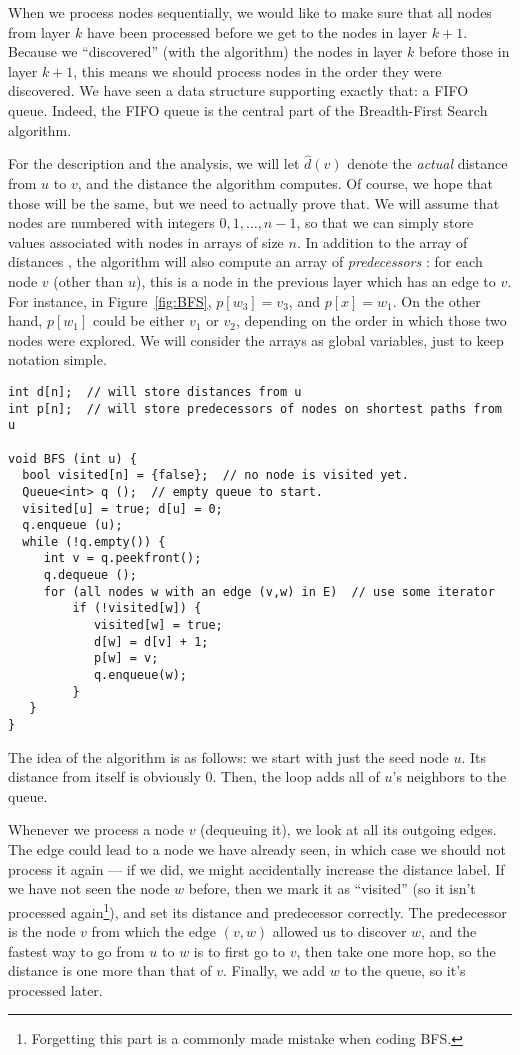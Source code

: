 When we process nodes sequentially, we would like to make sure that
all nodes from layer $k$ have been processed before we get to the
nodes in layer $k+1$. Because we ``discovered'' (with the algorithm)
the nodes in layer $k$ before those in layer $k+1$, this means we
should process nodes in the order they were discovered. 
We have seen a data structure supporting exactly that: a FIFO queue.
Indeed, the FIFO queue is the central part of the Breadth-First Search
algorithm.

For the description and the analysis, we will let
$\hat{d}(v)$ denote the \emph{actual} distance from $u$ to $v$, and
 the distance the algorithm computes. 
Of course, we hope that those will be the same, but we need to
actually prove that.
We will assume that nodes are numbered with integers 
$0, 1, \ldots, n-1$, so that we can simply store values associated
with nodes in arrays of size $n$.
In addition to the array of distances , the algorithm will
also compute an array of \emph{predecessors} : for each
node $v$ (other than $u$), this is a node in the previous layer which
has an edge to $v$. 
For instance, in Figure~\ref{fig:BFS}, $p[w_3] = v_3$, and $p[x] =
w_1$. On the other hand, $p[w_1]$ could be either $v_1$ or $v_2$,
depending on the order in which those two nodes were explored.
We will consider the arrays as global variables, just to keep notation
simple.

\begin{verbatim}
int d[n];  // will store distances from u
int p[n];  // will store predecessors of nodes on shortest paths from u

void BFS (int u) {
  bool visited[n] = {false};  // no node is visited yet.
  Queue<int> q ();  // empty queue to start.
  visited[u] = true; d[u] = 0;
  q.enqueue (u);
  while (!q.empty()) {
     int v = q.peekfront();
     q.dequeue ();
     for (all nodes w with an edge (v,w) in E)  // use some iterator
         if (!visited[w]) {
            visited[w] = true;
            d[w] = d[v] + 1;
            p[w] = v;
            q.enqueue(w);
         }
   }
}
\end{verbatim}
The idea of the algorithm is as follows: we start with just the seed
node $u$. Its distance from itself is obviously 0.
Then, the  loop adds all of $u$'s neighbors to the queue.

Whenever we process a node $v$ (dequeuing it), we look at all its
outgoing edges. 
The edge could lead to a node we have already seen, in which case we
should not process it again --- if we did, we might accidentally
increase the distance label.
If we have not seen the node $w$ before, then we mark it as ``visited''
(so it isn't processed again\footnote{Forgetting this part is a
  commonly made mistake when coding BFS.}), and set its distance and
predecessor correctly. 
The predecessor is the node $v$ from which the edge $(v,w)$
allowed us to discover $w$, and the fastest way to go from $u$ to $w$
is to first go to $v$, then take one more hop, so the distance is one
more than that of $v$. Finally, we add $w$ to the queue, so it's
processed later.

